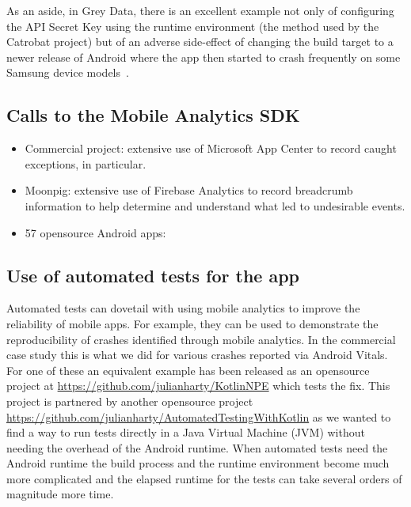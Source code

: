 As an aside, in Grey Data, there is an excellent example not only of configuring the API Secret Key using the runtime environment (the method used by the Catrobat project) but of an adverse side-effect of changing the build target to a newer release of Android where the app then started to crash frequently on some Samsung device models~\citep{scott2017_android_app_crash_noclassdeffounderror_on_samsung_lollipop_devices}. 


\subsection{Calls to the Mobile Analytics SDK}

\begin{itemize}
    \item Commercial project: extensive use of Microsoft App Center to record caught exceptions, in particular.
    \item Moonpig: extensive use of Firebase Analytics to record breadcrumb information to help determine and understand what led to undesirable events.
    \item 57 opensource Android apps: 
\end{itemize}


\subsection{Use of automated tests for the app}
Automated tests can dovetail with using mobile analytics to improve the reliability of mobile apps. For example, they can be used to demonstrate the reproducibility of crashes identified through mobile analytics. In the commercial case study this is what we did for various crashes reported via Android Vitals. For one of these an equivalent example has been released as an opensource project at \url{https://github.com/julianharty/KotlinNPE} which tests the fix. This project is partnered by another opensource project \url{https://github.com/julianharty/AutomatedTestingWithKotlin} as we wanted to find a way to run tests directly in a Java Virtual Machine (JVM) without needing the overhead of the Android runtime. When automated tests need the Android runtime the build process and the runtime environment become much more complicated and the elapsed runtime for the tests can take several orders of magnitude more time.

